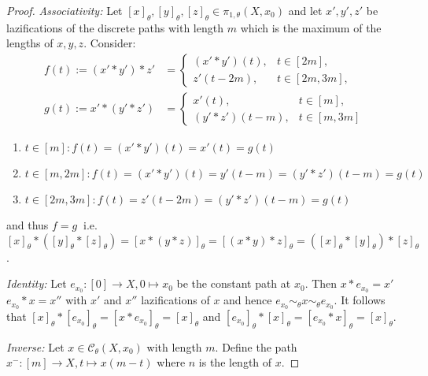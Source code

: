 \documentclass[a4paper, 11pt, twoside]{article}
\theoremstyle{break}
\theoremstyle{break}
\begin{document}
\begin{proof}
  \textit{Associativity:}
    Let $[x]_{\theta}, [y]_{\theta}, [z]_{\theta} \in \pi_{1,\theta}(X, x_0)$ 
    and let $x', y', z'$ be lazifications of the discrete paths with length $m$ which is the maximum of the lengths of $x,y,z$. Consider:
    \begin{align*}
      f(t) := (x' * y') * z' &= \begin{cases}
        (x' * y')(t), &t \in [2m], \\
        z'(t - 2m), &t \in [2m, 3m],
      \end{cases}\\
      g(t) := x' * (y' * z') &= \begin{cases}
        x'(t), &t \in [m], \\
        (y' * z')(t - m), &t \in [m, 3m]
      \end{cases}
    \end{align*}
  \begin{enumerate}
    \item $t \in [m]: f(t) = (x' * y')(t) = x'(t) = g(t)$
    \item $t \in [m,2m]: f(t) = (x' * y')(t) = y'(t - m) = (y' * z')(t - m) = g(t)$
    \item $t \in [2m,3m]: f(t) = z'(t - 2m) = (y' * z')(t - m) = g(t)$
  \end{enumerate}
  and thus $f = g\:$ i.e. $[x]_{\theta} * ([y]_{\theta} * [z]_{\theta}) = [x * (y * z)]_{\theta} = [(x * y) * z]_{\theta} = ([x]_{\theta} * [y]_{\theta}) * [z]_{\theta}$.
  
  \textit{Identity:}
  Let $e_{x_0}: [0] \to X, 0 \mapsto x_0$ be the constant path at $x_0$. Then $x * e_{x_0} = x'$ $e_{x_0} * x = x''$ with $x'$ and $x''$ lazifications of $x$ 
  and hence $e_{x_0} \sim_{\theta} x \sim_{\theta} e_{x_0}$.
  It follows that $[x]_{\theta} * [e_{x_0}]_{\theta} = [x * e_{x_0}]_{\theta} = [x]_{\theta}$ and $[e_{x_0}]_{\theta} * [x]_{\theta} = [e_{x_0} * x]_{\theta} = [x]_{\theta}$.
  
  \textit{Inverse:}
  Let $x \in \mathcal{C}_{\theta}(X, x_0)$ with length $m$. Define the path $x^-: [m] \to X, t \mapsto x(m - t)$ where $n$ is the length of $x$.


\end{proof}
\end{document}
